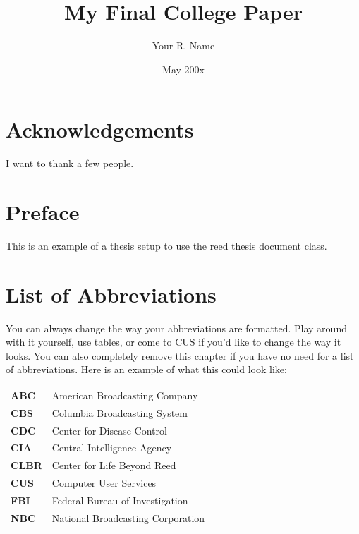 \documentclass[12pt,twoside]{reedthesis}
\title{My Final College Paper}
\author{Your R. Name}
\date{May 200x}
\begin{document}
  \maketitle
  \frontmatter %
  \pagestyle{empty} %

    \chapter*{Acknowledgements}
	I want to thank a few people.

    \chapter*{Preface}
	This is an example of a thesis setup to use the reed thesis document class.
	
	

    \chapter*{List of Abbreviations}
		You can always change the way your abbreviations are formatted. Play around with it yourself, use tables, or come to CUS if you'd like to change the way it looks. You can also completely remove this chapter if you have no need for a list of abbreviations. Here is an example of what this could look like:

	\begin{table}[h]
	\centering %
	\begin{tabular}{ll}
		\textbf{ABC}  	&  American Broadcasting Company \\
		\textbf{CBS}  	&  Columbia Broadcasting System\\
		\textbf{CDC}  	&  Center for Disease Control \\
		\textbf{CIA}  	&  Central Intelligence Agency\\
		\textbf{CLBR} 	&  Center for Life Beyond Reed\\
		\textbf{CUS}  	&  Computer User Services\\
		\textbf{FBI}  	&  Federal Bureau of Investigation\\
		\textbf{NBC}  	&  National Broadcasting Corporation\\
	\end{tabular}
	\end{table}
	
\end{document}
